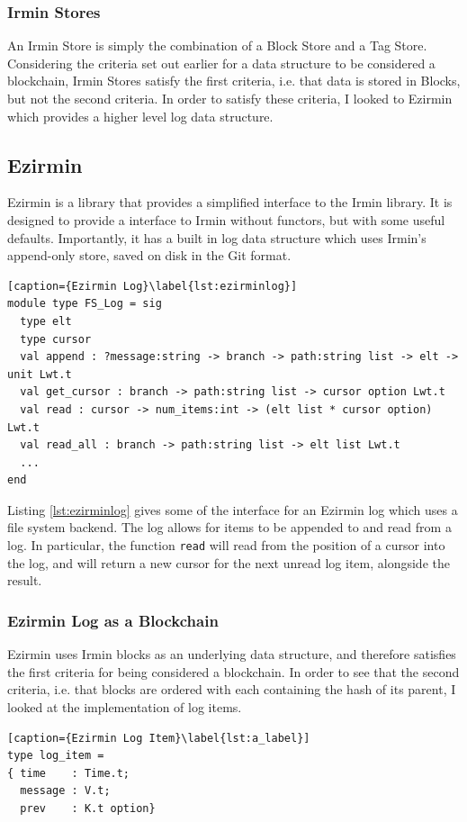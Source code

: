 \documentclass[12pt,a4paper,twoside,openright]{report}
\begin{document}
		\subsubsection*{Irmin Stores}
		An Irmin Store is simply the combination of a Block Store and a Tag Store.
		Considering the criteria set out earlier for a data structure to be considered a blockchain, Irmin Stores satisfy the first criteria, i.e. that data is stored in Blocks, but not the second criteria.
		In order to satisfy these criteria, I looked to Ezirmin which provides a higher level log data structure.

	\subsection{Ezirmin}
	Ezirmin is a library that provides a simplified interface to the Irmin library. It is designed to provide a interface to Irmin without functors, but with some useful defaults. Importantly, it has a built in log data structure which uses Irmin's append-only store, saved on disk in the Git format.\\
	\begin{lstlisting}[caption={Ezirmin Log}\label{lst:ezirminlog}]
module type FS_Log = sig
  type elt 
  type cursor 
  val append : ?message:string -> branch -> path:string list -> elt -> unit Lwt.t
  val get_cursor : branch -> path:string list -> cursor option Lwt.t
  val read : cursor -> num_items:int -> (elt list * cursor option) Lwt.t
  val read_all : branch -> path:string list -> elt list Lwt.t
  ...
end
	\end{lstlisting}
	Listing \ref{lst:ezirminlog} gives some of the interface for an Ezirmin log which uses a file system backend.
	The log allows for items to be appended to and read from a log.
	In particular, the function \texttt{read} will read from the position of a cursor into the log, and will return a new cursor for the next unread log item, alongside the result.

	\subsubsection*{Ezirmin Log as a Blockchain}
	Ezirmin uses Irmin blocks as an underlying data structure, and therefore satisfies the first criteria for being considered a blockchain. 
	In order to see that the second criteria, i.e. that blocks are ordered with each containing the hash of its parent, I looked at the implementation of log items.

	\begin{lstlisting}[caption={Ezirmin Log Item}\label{lst:a_label}]
type log_item =
{ time    : Time.t;
  message : V.t;
  prev    : K.t option}
	\end{lstlisting}
\end{document}
